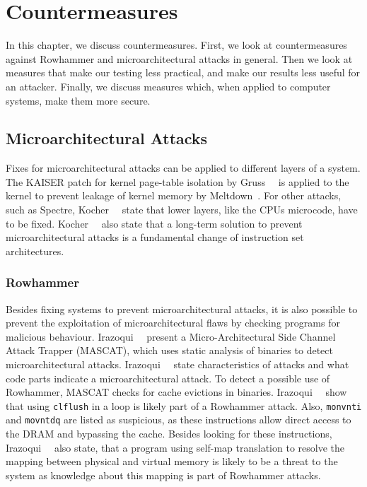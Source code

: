 \chapter{Countermeasures}\label{sec:countermeasure}

In this chapter, we discuss countermeasures. First, we look at countermeasures
against Rowhammer and microarchitectural attacks in general. Then we look at
measures that make our testing less practical, and make our results less useful
for an attacker. Finally, we discuss measures which, when applied to computer
systems, make them more secure.

\section{Microarchitectural Attacks}

Fixes for microarchitectural attacks can be applied to different layers of a
system. The KAISER patch for kernel page-table isolation by
Gruss~\etal~\cite{kaiserpaper} is applied to the kernel to prevent leakage of
kernel memory by Meltdown~\cite{meltdown}. For other attacks, such as Spectre,
Kocher~\etal~\cite{spectre} state that lower layers, like the
CPU\textquotesingle s microcode, have to be fixed. Kocher~\etal~\cite{spectre}
also state that a long-term solution to prevent microarchitectural attacks is a
fundamental change of instruction set architectures.

\subsection{Rowhammer}

Besides fixing systems to prevent microarchitectural attacks, it is also
possible to prevent the exploitation of microarchitectural flaws by checking
programs for malicious behaviour. Irazoqui~\etal~\cite{mascat} present a
Micro-Architectural Side Channel Attack Trapper (MASCAT), which uses static
analysis of binaries to detect microarchitectural attacks.
Irazoqui~\etal~\cite{mascat} state characteristics of attacks and what code
parts indicate a microarchitectural attack. To detect a possible use of
Rowhammer, MASCAT checks for cache evictions in binaries.
Irazoqui~\etal~\cite{mascat} show that using \texttt{clflush} in a loop is
likely part of a Rowhammer attack. Also, \texttt{monvnti} and \texttt{movntdq}
are listed as suspicious, as these instructions allow direct access to the DRAM
and bypassing the cache. Besides looking for these instructions,
Irazoqui~\etal~\cite{mascat} also state, that a program using self-map
translation to resolve the mapping between physical and virtual memory is likely
to be a threat to the system as knowledge about this mapping is part of
Rowhammer attacks.

